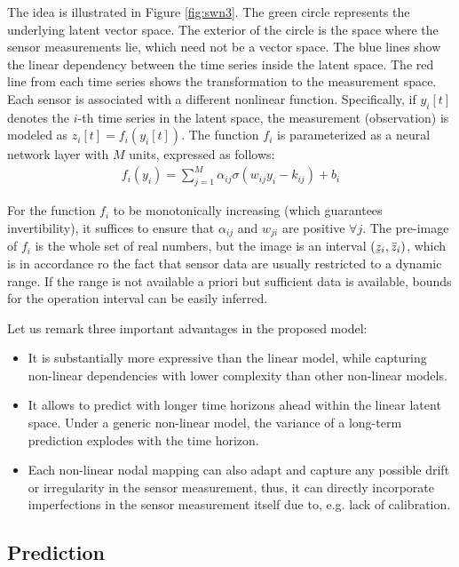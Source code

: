 The idea is illustrated in Figure \ref{fig:swn3}. The green circle represents the underlying latent vector space. The exterior of the circle is the space where the sensor measurements lie, which need not be a vector space. The blue lines show the linear dependency between the time series inside the latent space. The red line from each time series shows the transformation to the measurement space. Each sensor is associated with a different nonlinear function. Specifically, if $y_i[t]$ denotes the $i$-th time series in the latent space, the measurement (observation) is modeled as $z_{i}[t]=f_{i}\left(y_{i}[t]\right)$. The function $f_i$  is parameterized as a neural network layer with $M$ units, expressed as follows:
\begin{align} 
\label{eq:f_model}
    f_{i}\left(y_{i}\right)=\sum_{j=1}^{M} \alpha_{ij} \sigma\left(w_{ij}y_{i}-k_{ij}\right)+b_{i}
\end{align}

For the function $f_i$ to be monotonically increasing (which guarantees invertibility), it suffices to ensure that $\alpha_{ij}$ and  $w_{ji}$ are positive $\forall j$. The pre-image of $f_i$ is the whole set of real numbers, but the image is an interval $(\ubar{z}_i, \bar{z}_i)$, which is in accordance ro the fact that sensor data are usually restricted to a dynamic range. If the range is not available a priori but sufficient data is available, bounds for the operation interval can be easily inferred.

Let us remark three important advantages in the proposed model: 
\begin{itemize}
    \item It is substantially more expressive than the linear model, while capturing non-linear dependencies with lower complexity than other non-linear models. 
    \item It allows to predict with longer time horizons ahead within the linear latent space. Under a generic non-linear model, the variance of a long-term prediction explodes with the time horizon.
    \item Each non-linear nodal mapping can also adapt and capture any possible drift or irregularity in the sensor measurement, thus, it can directly incorporate imperfections in the sensor measurement itself due to, e.g. lack of calibration.    
\end{itemize}

\subsection{Prediction}

